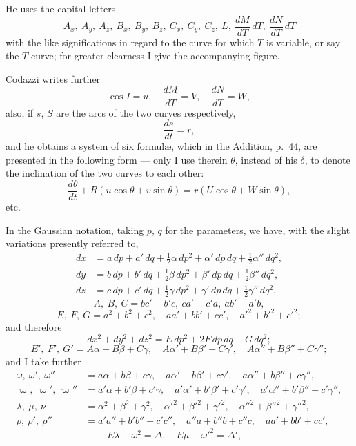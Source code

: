 \documentclass[11pt,a4paper]{book}
\begin{document}
{{{He uses the capital letters
\[
A_x,\ A_y,\ A_z,\ B_x,\ B_y,\ B_z,\ C_x,\ C_y,\ C_z,\ L,\ \frac{dM}{dT}\,dT,\ \frac{dN}{dT}\,dT
\]
with the like significations in regard to the curve for which $T$ is variable, or say
the $T$-curve; for greater clearness I give the accompanying figure.

Codazzi writes further
\[
\cos I = u, \quad
\frac{dM}{dT} = V, \quad
\frac{dN}{dT} = W,
\]
also, if $s$, $S$ are the arcs of the two curves respectively,
\[
\frac{ds}{dt} = r,
\]
and he obtains a system of six formul\ae, which in the Addition, p.\ 44, are presented
in the following form --- only I use therein $\theta$, instead of his $\delta$, to denote the
inclination of the two curves to each other:
\[
\frac{d\theta}{dt} + R(u\cos\theta + v\sin\theta) = r(U\cos\theta + W\sin\theta),
\]
etc.

In the Gaussian notation, taking $p$, $q$ for the parameters, we have, with the slight
variations presently referred to,
\begin{align*}
dx &= a\,dp + a'\,dq + \tfrac12\alpha\,dp^2 + \alpha'\,dp\,dq + \tfrac12\alpha''\,dq^2,\\
dy &= b\,dp + b'\,dq + \tfrac12\beta\,dp^2 + \beta'\,dp\,dq + \tfrac12\beta''\,dq^2,\\
dz &= c\,dp + c'\,dq + \tfrac12\gamma\,dp^2 + \gamma'\,dp\,dq + \tfrac12\gamma''\,dq^2,
\end{align*}
\[
A,\ B,\ C = bc' - b'c,\ ca' - c'a,\ ab' - a'b,
\]
\[
E,\ F,\ G = a^2 + b^2 + c^2,\quad aa' + bb' + cc',\quad a'^2 + b'^2 + c'^2;
\]
and therefore
\[
dx^2 + dy^2 + dz^2 = E\,dp^2 + 2F\,dp\,dq + G\,dq^2;
\]
\[
E',\ F',\ G' = A\alpha + B\beta + C\gamma,\quad A\alpha' + B\beta' + C\gamma',\quad
A\alpha'' + B\beta'' + C\gamma'';
\]
and I take further
\begin{align*}
\omega,\ \omega',\ \omega'' &= a\alpha + b\beta + c\gamma,\quad a\alpha' + b\beta' + c\gamma',\quad
a\alpha'' + b\beta'' + c\gamma'',\\
\varpi,\ \varpi',\ \varpi'' &= a'\alpha + b'\beta + c'\gamma,\quad a'\alpha' + b'\beta' + c'\gamma',\quad
a'\alpha'' + b'\beta'' + c'\gamma'',\\
\lambda,\ \mu,\ \nu &= \alpha^2 + \beta^2 + \gamma^2,\quad \alpha'^2 + \beta'^2 + \gamma'^2,\quad
\alpha''^2 + \beta''^2 + \gamma''^2,\\
\rho,\ \rho',\ \rho'' &= a'a'' + b'b'' + c'c'',\quad a''a + b''b + c''c,\quad aa' + bb' + cc',
\end{align*}
\[
E\lambda - \omega^2 = \Delta, \quad E\mu - \omega'^2 = \Delta', \quad
\]}}}
\end{document}
